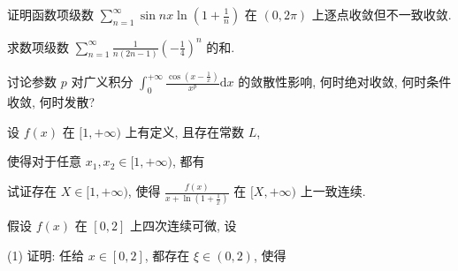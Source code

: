 \par{}
证明函数项级数 $\sum_{n=1}^{\infty} \sin nx \ln \left(1 + \frac{1}{n}\right)$ 在 $(0,2\pi)$ 上逐点收敛但不一致收敛.\par
\par{}
求数项级数 $\sum_{n=1}^{\infty} \frac{1}{n(2n-1)} \left(-\frac{1}{4}\right)^n$ 的和.\par
\par{}
讨论参数 $p$ 对广义积分 $\int_0^{+\infty} \frac{\cos\left(x - \frac{1}{x}\right)}{x^p} \mathrm{d}x$ 的敛散性影响, 何时绝对收敛, 何时条件收敛, 何时发散?\par
\par{}
设 $f(x)$ 在 $[1,+\infty)$ 上有定义, 且存在常数 $L$,\par
\par{}
使得对于任意 $x_1,x_2\in[1,+\infty)$, 都有\par
\nopagebreak[4]
试证存在 $X \in [1, +\infty)$, 使得 $\frac{f(x)}{x + \ln\left(1 + \frac{1}{x}\right)}$ 在 $[X, +\infty)$ 上一致连续.\par
\par{}
\par{}
假设 $f(x)$ 在 $[0,2]$ 上四次连续可微, 设\par
\nopagebreak[4]
\par{}
(1) 证明: 任给 $x \in [0,2]$, 都存在 $\xi \in (0,2)$, 使得\par
\nopagebreak[4]
